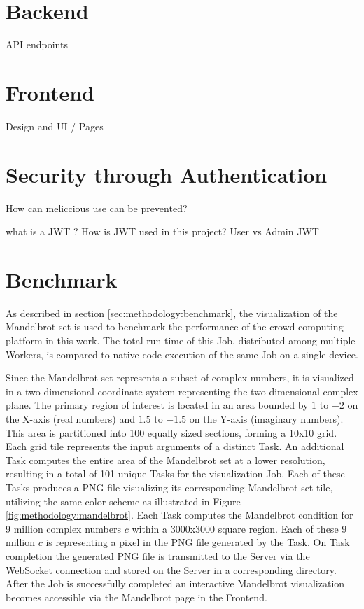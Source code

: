 \section{Backend}
\label{sec:implementation:backend}
API endpoints 

\section{Frontend}
\label{sec:implementation:frontend}
Design and UI / Pages

\section{Security through Authentication}
\label{sec:implementation:authentication}
How can meliccious use can be prevented?

what is a JWT ? How is JWT used in this project? User vs Admin JWT

\section{Benchmark}
\label{sec:implementation:benchmark}
As described in section \ref{sec:methodology:benchmark}, the visualization of the Mandelbrot set is used to benchmark the performance of the crowd computing platform in this work. The total run time of this Job, distributed among multiple Workers, is compared to native code execution of the same Job on a single device.

Since the Mandelbrot set represents a subset of complex numbers, it is visualized in a two-dimensional coordinate system representing the two-dimensional complex plane. The primary region of interest is located in an area bounded by $1$ to $-2$ on the X-axis (real numbers) and $1.5$ to $-1.5$ on the Y-axis (imaginary numbers). This area is partitioned into 100 equally sized sections, forming a 10x10 grid. Each grid tile represents the input arguments of a distinct Task. An additional Task computes the entire area of the Mandelbrot set at a lower resolution, resulting in a total of 101 unique Tasks for the visualization Job. Each of these Tasks produces a \ac{PNG} file visualizing its corresponding Mandelbrot set tile, utilizing the same color scheme as illustrated in Figure \ref{fig:methodology:mandelbrot}. Each Task computes the Mandelbrot condition for 9 million complex numbers $c$ within a 3000x3000 square region. Each of these 9 million $c$ is representing a pixel in the \ac{PNG} file generated by the Task. On Task completion the generated \ac{PNG} file is transmitted to the Server via the WebSocket connection and stored on the Server in a corresponding directory. After the Job is successfully completed an interactive Mandelbrot visualization becomes accessible via the Mandelbrot page in the Frontend.

